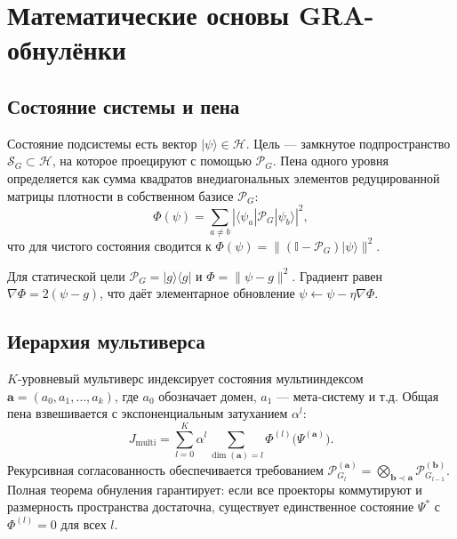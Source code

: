 \documentclass[12pt,a4paper]{article}
\begin{document}
\section{Математические основы GRA-обнулёнки}

\subsection{Состояние системы и пена}
Состояние подсистемы есть вектор $|\psi\rangle \in \mathcal{H}$.
Цель — замкнутое подпространство $\mathcal{S}_G \subset \mathcal{H}$, на которое проецируют с помощью $\mathcal{P}_G$.
Пена одного уровня определяется как сумма квадратов внедиагональных элементов редуцированной матрицы плотности в собственном базисе $\mathcal{P}_G$:
\begin{equation}\label{eq:foam}
\Phi(\psi) = \sum_{a \neq b} |\langle \psi_a | \mathcal{P}_G | \psi_b \rangle|^2,
\end{equation}
что для чистого состояния сводится к $\Phi(\psi) = \| (\mathbb{I}-\mathcal{P}_G)|\psi\rangle \|^2$.

Для статической цели $\mathcal{P}_G = |g\rangle\langle g|$ и $\Phi = \|\psi - g\|^2$.
Градиент равен $\nabla \Phi = 2(\psi - g)$, что даёт элементарное обновление $\psi \leftarrow \psi - \eta \nabla \Phi$.

\subsection{Иерархия мультиверса}
$K$-уровневый мультиверс индексирует состояния мультииндексом $\mathbf{a} = (a_0,a_1,\dots,a_k)$,
где $a_0$ обозначает домен, $a_1$ — мета‑систему и т.д.
Общая пена взвешивается с экспоненциальным затуханием $\alpha^l$:
\begin{equation}
J_{\text{multi}} = \sum_{l=0}^{K} \alpha^l \sum_{\dim(\mathbf{a})=l} \Phi^{(l)}\big(\Psi^{(\mathbf{a})}\big).
\end{equation}
Рекурсивная согласованность обеспечивается требованием
$\mathcal{P}_{G_l}^{(\mathbf{a})} = \bigotimes_{\mathbf{b}\prec\mathbf{a}} \mathcal{P}_{G_{l-1}}^{(\mathbf{b})}$.
Полная теорема обнуления гарантирует: если все проекторы коммутируют и размерность пространства достаточна, существует единственное состояние $\Psi^*$ с $\Phi^{(l)}=0$ для всех $l$.
\end{document}
